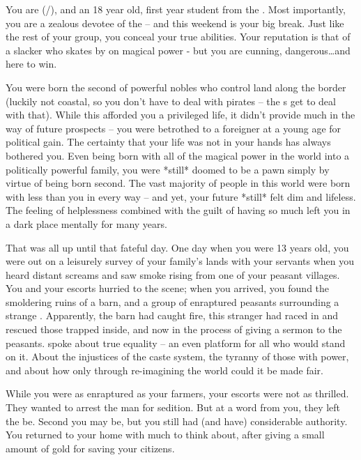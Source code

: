 \documentclass[char]{GL2020}
\begin{document}
\name{\cChupStudent{}}
 
You are \cChupStudent{\full} (\cChupStudent{\they}/\cChupStudent{\them}), and an 18 year old, first year student from the \pFarm{}. Most importantly, you are a zealous devotee of the \pGoaties{} -- and this weekend is your big break. Just like the rest of your group, you conceal your true abilities. Your reputation is that of a slacker who skates by on \cChupStudent{\their} magical power - but you are cunning, dangerous\ldots and here to win.
 
You were born the second \cChupStudent{\child} of powerful nobles who control land along the \pTech{} border (luckily not coastal, so you don't have to deal with pirates – the \cWildCard{\formal}s get to deal with that). While this afforded you a privileged life, it didn't provide much in the way of future prospects -- you were betrothed to a foreigner at a young age for political gain. The certainty that your life was not in your hands has always bothered you. Even being born with all of the magical power in the world into a politically powerful family, you were *still* doomed to be a pawn simply by virtue of being born second. The vast majority of people in this world were born with less than you in every way -- and yet, your future *still* felt dim and lifeless. The feeling of helplessness combined with the guilt of having so much left you in a dark place mentally for many years.
 
That was all up until that fateful day. One day when you were 13 years old, you were out on a leisurely survey of your family's lands with your servants when you heard distant screams and saw smoke rising from one of your peasant villages. You and your escorts hurried to the scene; when you arrived, you found the smoldering ruins of a barn, and a group of enraptured peasants surrounding a strange \cChupLeader{\person}. Apparently, the barn had caught fire, this stranger had raced in and rescued those trapped inside, and \cChupLeader{\they} \cChupLeader{\were} now in the process of giving a sermon to the peasants. \cChupLeader{\They} spoke about true equality -- an even platform for all who would stand on it. About the injustices of the caste system, the tyranny of those with power, and about how only through re-imagining the world could it be made fair. 
 
While you were as enraptured as your farmers, your escorts were not as thrilled. They wanted to arrest the man for sedition. But at a word from you, they left the \cChupLeader{\person} be. Second \cChupStudent{\child} you may be, but you still had (and have) considerable authority. You returned to your home with much to think about, after giving \cChupLeader{\them} a small amount of gold for saving your citizens.
 
\end{document}
